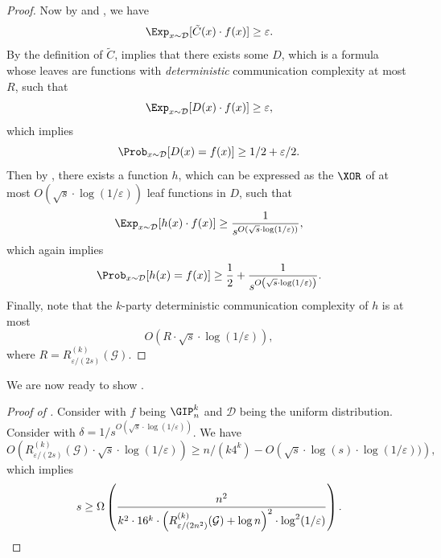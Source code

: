 \begin{proof}
        Now by  and , we have
        \begin{equation}\label{eq:lb-eq-1}
	        \Exp_{x\sim\mathcal{D}}[\tilde{C}(x)\cdot f(x)]\geq \varepsilon.
        \end{equation}
        By the definition of $\tilde{C}$,  implies that there exists some $D$, which is a formula whose leaves are functions with \emph{deterministic} communication complexity at most $R$, such that
        \[
            \Exp_{x\sim\mathcal{D}}[D(x)\cdot f(x)]\geq \varepsilon,
        \]
        which implies
        \[
            \Prob_{x\sim\mathcal{D}}[D(x)=f(x)]\geq 1/2+ \varepsilon/2.
        \]
        Then by , there exists a function $h$, which can be expressed as the $\XOR$ of at most $O(\sqrt{s}\cdot\log(1/\varepsilon))$ leaf functions in $D$, such that
        \[
            \Exp_{x\sim\mathcal{D}}[h(x)\cdot f(x)]\geq \frac{1}{s^{O(\sqrt{s}\cdot\log(1/\varepsilon))}},
        \]
        which again implies
        \[
            \Prob_{x\sim\mathcal{D}}[h(x)=f(x)]\geq \frac{1}{2} + \frac{1}{s^{O\left(\sqrt{s}\cdot\log(1/\varepsilon)\right)}}.
        \]
        Finally, note that the $k$-party deterministic communication complexity of $h$ is at most 
        \[
            O(R\cdot\sqrt{s}\cdot\log(1/\varepsilon)),
        \]
        where $R=R^{(k)}_{\varepsilon/(2s)}(\mathcal{G})$.
    \end{proof}
    
    We are now ready to show .
    
    \begin{proof}[Proof of ]
        Consider  with $f$ being $\GIP_{n}^{k}$ and $\mathcal{D}$ being the uniform distribution. Consider  with $\delta=1/s^{O(\sqrt{s}\cdot\log(1/\varepsilon))}$. We have
        \[
            O\left(R^{(k)}_{\varepsilon/(2s)}(\mathcal{G})\cdot\sqrt{s}\cdot\log(1/\varepsilon)\right)\geq n/(k4^k) - O\left(\sqrt{s}\cdot\log(s)\cdot\log(1/\varepsilon))\right),
        \]
        which implies
        \[
            s\geq \Omega\left( \frac{n^2}{k^2\cdot 16^{k}\cdot\left(R^{(k)}_{\varepsilon/(2n^2)}(\mathcal{G})+\log n\right)^2\cdot\log^2(1/\varepsilon)}\right).\qedhere
        \]
    \end{proof}
	
